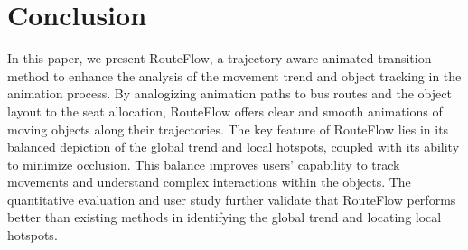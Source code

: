 \section{Conclusion}
In this paper, we present RouteFlow, a trajectory-aware animated transition method to enhance the analysis of the movement trend and object tracking in the animation process. 
By analogizing animation paths to bus routes and the object layout to the seat allocation, RouteFlow offers clear and smooth animations of moving objects along their trajectories.
The key feature of RouteFlow lies in its balanced depiction of the global trend and local hotspots, coupled with its ability to minimize occlusion.
This balance improves users' capability to track movements and understand complex interactions within the objects.
The quantitative evaluation and user study further validate that RouteFlow performs better than existing methods in identifying the global trend and locating local hotspots. 

